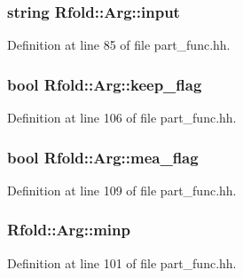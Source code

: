 \hypertarget{class_rfold_1_1_arg_a9844cbade756ff05f5c9592f17a63d95}{
\subsubsection[{input}]{\setlength{\rightskip}{0pt plus 5cm}string Rfold\+::\+Arg\+::input}}\label{class_rfold_1_1_arg_a9844cbade756ff05f5c9592f17a63d95}


Definition at line 85 of file part\+\_\+func.\+hh.

\hypertarget{class_rfold_1_1_arg_ab606ce2fd660a90d7af0f1d5773ffd57}{
\subsubsection[{keep\+\_\+flag}]{\setlength{\rightskip}{0pt plus 5cm}bool Rfold\+::\+Arg\+::keep\+\_\+flag}}\label{class_rfold_1_1_arg_ab606ce2fd660a90d7af0f1d5773ffd57}


Definition at line 106 of file part\+\_\+func.\+hh.

\hypertarget{class_rfold_1_1_arg_a7b3d1a355bec84586c9832c1858a2f6b}{
\subsubsection[{mea\+\_\+flag}]{\setlength{\rightskip}{0pt plus 5cm}bool Rfold\+::\+Arg\+::mea\+\_\+flag}}\label{class_rfold_1_1_arg_a7b3d1a355bec84586c9832c1858a2f6b}


Definition at line 109 of file part\+\_\+func.\+hh.

\hypertarget{class_rfold_1_1_arg_a4ea3681597506bb5d8b10e2cda9a3ca6}{
\subsubsection[{minp}]{ Rfold\+::\+Arg\+::minp}}\label{class_rfold_1_1_arg_a4ea3681597506bb5d8b10e2cda9a3ca6}


Definition at line 101 of file part\+\_\+func.\+hh.

